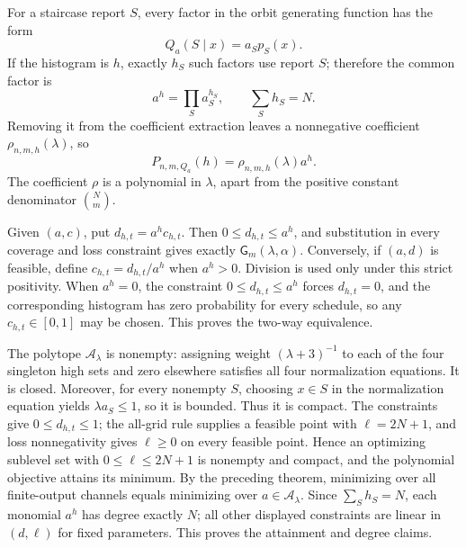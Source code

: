 For a staircase report \(S\), every factor in the orbit generating function has the form
\[
 Q_a(S\mid x)=a_Sp_S(x).
\]
If the histogram is \(h\), exactly \(h_S\) such factors use report \(S\); therefore the common factor is
\[
 a^h=\prod_Sa_S^{h_S},\qquad \sum_Sh_S=N.
\]
Removing it from the coefficient extraction leaves a nonnegative coefficient \(\rho_{n,m,h}(\lambda)\), so
\[
 P_{n,m,Q_a}(h)=\rho_{n,m,h}(\lambda)a^h.
\]
The coefficient \(\rho\) is a polynomial in \(\lambda\), apart from the positive constant denominator \(\binom Nm\).

Given \((a,c)\), put \(d_{h,t}=a^hc_{h,t}\).  Then \(0\le d_{h,t}\le a^h\), and substitution in every coverage and loss constraint gives exactly \(\mathsf G_m(\lambda,\alpha)\).  Conversely, if \((a,d)\) is feasible, define \(c_{h,t}=d_{h,t}/a^h\) when \(a^h>0\).  Division is used only under this strict positivity.  When \(a^h=0\), the constraint \(0\le d_{h,t}\le a^h\) forces \(d_{h,t}=0\), and the corresponding histogram has zero probability for every schedule, so any \(c_{h,t}\in[0,1]\) may be chosen.  This proves the two-way equivalence.

The polytope \(\mathcal A_\lambda\) is nonempty: assigning weight \((\lambda+3)^{-1}\) to each of the four singleton high sets and zero elsewhere satisfies all four normalization equations.  It is closed.  Moreover, for every nonempty \(S\), choosing \(x\in S\) in the normalization equation yields \(\lambda a_S\le1\), so it is bounded.  Thus it is compact.  The constraints give \(0\le d_{h,t}\le1\); the all-grid rule supplies a feasible point with \(\ell=2N+1\), and loss nonnegativity gives \(\ell\ge0\) on every feasible point.  Hence an optimizing sublevel set with \(0\le\ell\le2N+1\) is nonempty and compact, and the polynomial objective attains its minimum.  By the preceding theorem, minimizing over all finite-output channels equals minimizing over \(a\in\mathcal A_\lambda\).  Since \(\sum_Sh_S=N\), each monomial \(a^h\) has degree exactly \(N\); all other displayed constraints are linear in \((d,\ell)\) for fixed parameters.  This proves the attainment and degree claims.

